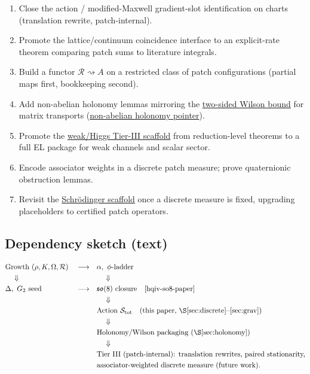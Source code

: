 \documentclass[11pt]{amsart}
\begin{document}
\begin{enumerate}
\item Close the action / modified-Maxwell gradient-slot identification on charts (translation rewrite, patch-internal).
\item Promote the lattice/continuum coincidence interface to an explicit-rate theorem comparing patch sums to literature integrals.
\item Build a functor \(\mathcal{R}\rightsquigarrow A\) on a restricted class of patch configurations (partial maps first, bookkeeping second).
\item Add non-abelian holonomy lemmas mirroring the \hyperref[lean:wilson-bounds]{two-sided Wilson bound} for matrix transports (\hyperref[lean:non-abelian-pointer]{non-abelian holonomy pointer}).
\item Promote the \hyperref[lean:weakHiggs-scaffold]{weak/Higgs Tier-III scaffold} from reduction-level theorems to a full EL package for weak channels and scalar sector.
\item Encode associator weights in a discrete patch measure; prove quaternionic obstruction lemmas.
\item Revisit the \hyperref[lean:schrodinger]{Schr\"odinger scaffold} once a discrete measure is fixed, upgrading placeholders to certified patch operators.
\end{enumerate}

\subsection{Dependency sketch (text)}

\[
\begin{aligned}
&\text{Growth }(\rho,K,\Omega,\mathcal{R}) &&\longrightarrow &&\alpha,\ \phi\text{-ladder} \\
&\quad\Downarrow && &&\quad\Downarrow \\
&\Delta,\ G_2\text{ seed} &&\longrightarrow &&\mathfrak{so}(8)\text{ closure} \quad \text{\cite{hqiv-so8-paper}}\\
&\quad && &&\quad\Downarrow \\
& && &&\text{Action } \mathcal{S}_{\mathrm{tot}}\quad\text{(this paper, \S\ref{sec:discrete}--\ref{sec:grav})}\\
&\quad && &&\quad\Downarrow \\
& && &&\text{Holonomy/Wilson packaging (\S\ref{sec:holonomy})}\\
&\quad && &&\quad\Downarrow \\
& && &&\text{Tier III (patch-internal): translation rewrites, paired stationarity,}\\
& && &&\text{associator-weighted discrete measure (future work).}
\end{aligned}
\]
\end{document}
